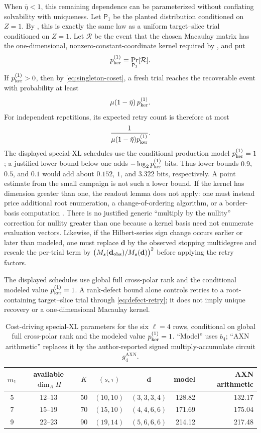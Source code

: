 \documentclass[11pt]{article}
\begin{document}
When $\bar\eta<1$, this remaining dependence can be parameterized without
conflating solvability with uniqueness.  Let $\mathsf P_1$ be the planted distribution conditioned
on $Z=1$.  By , this is exactly the same law as a
uniform target--slice trial conditioned on $Z=1$.  Let $\mathcal R$ be the
event that the chosen Macaulay matrix has the one-dimensional,
nonzero-constant-coordinate kernel required by
, and put
\[
 p_{\rm ker}^{(1)}=\Pr_{\mathsf P_1}[\mathcal R].
\]
If $p_{\rm ker}^{(1)}>0$, then by \eqref{eq:singleton-coset}, a fresh trial
reaches the recoverable event with probability at least
\[
 \mu(1-\bar\eta)\,p_{\rm ker}^{(1)}.
\]
For independent repetitions, its expected retry count is therefore at most
\[
 \frac{1}{\mu(1-\bar\eta)p_{\rm ker}^{(1)}}.
\]
The displayed special-XL schedules use the conditional production model
$p_{\rm ker}^{(1)}=1$; a justified lower bound below one adds
$-\log_2p_{\rm ker}^{(1)}$ bits.  Thus lower bounds $0.9$, $0.5$, and $0.1$
would add about $0.152$, $1$, and $3.322$ bits, respectively.  A point
estimate from the small campaign is not such a lower bound.  If the kernel has
dimension greater than one, the readout lemma
does not apply: one must instead price additional root enumeration, a
change-of-ordering algorithm, or a border-basis computation
\cite{FaugereEtAl1993FGLM,KehreinKreuzer2005}.
There is no justified generic ``multiply by the nullity'' correction for
nullity greater than one because a kernel basis need not enumerate evaluation
vectors.  Likewise, if the Hilbert-series sign change occurs earlier or later
than modeled, one must replace $\mathbf d$ by the observed stopping
multidegree and rescale the per-trial term by
$\bigl(M_s(\mathbf d_{\rm obs})/M_s(\mathbf d)\bigr)^2$ before applying the
retry factors.

The displayed schedules use global full cross-polar rank and the conditional
modeled value $p_{\rm ker}^{(1)}=1$.  A rank-defect bound alone controls
retries to a
root-containing target--slice trial through \eqref{eq:defect-retry}; it does
not imply unique recovery or a one-dimensional Macaulay kernel.

\begin{table}[tbp]
\centering
\caption{Cost-driving special-XL parameters for the six $\ell=4$ rows,
conditional on global full cross-polar rank and the modeled value
$p_{\rm ker}^{(1)}=1$.  ``Model'' uses $b_4$; ``AXN arithmetic'' replaces it by the
author-reported signed multiply-accumulate circuit
$g_4^{\mathrm{AXN}}$.}
\label{tab:xl-optima}
\scriptsize
\setlength{\tabcolsep}{4pt}
\begin{tabular}{@{}c c c c c r r@{}}
\toprule
$m_1$ & available $\dim_A H$ & $K$ & $(s,\tau)$ & $\mathbf d$ & model & AXN arithmetic\\
\midrule
5 & $12$--$13$ & 50 & $(10,10)$ & $(3,3,3,4)$ & 128.82 & 132.17\\
7 & $15$--$19$ & 70 & $(15,10)$ & $(4,4,6,6)$ & 171.69 & 175.04\\
9 & $22$--$23$ & 90 & $(19,14)$ & $(5,6,6,6)$ & 214.12 & 217.48\\
\bottomrule
\end{tabular}
\end{table}
\end{document}
